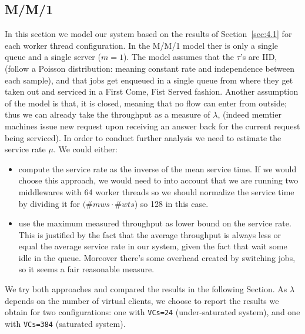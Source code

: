 \documentclass[11pt,a4paper]{article}
\begin{document}
\subsection{M/M/1}

In this section we model our system based on the results of Section~\ref{sec:4.1} for each worker thread configuration.
In the M/M/1 model ther is only a single queue and a single server ($m=1$). The model assumes that the $\tau$'s are IID, (follow a Poisson distribution: meaning constant rate and independence between each sample), and that jobs get enqueued in a single queue from where they get taken out and serviced in a First Come, Fist Served fashion. Another assumption of the model is that, it is closed, meaning that no flow can enter from outside; thus we can already take the throughput as a measure of $\lambda$, (indeed memtier machines issue new request upon receiving an answer back for the current request being serviced). 
In order to conduct further analysis we need to estimate the service rate $\mu$. We could either:
\begin{itemize}
    \item compute the service rate as the inverse of the mean service time. If we would choose this approach, we would need to into account that we are running two middlewares with 64 worker threads so we should normalize the service time by dividing it for $(\#mws \cdot \#wts$) so 128 in this case.
    \item use the maximum measured throughput as lower bound on the service rate. This is justified by the fact that the average throughput is always less or equal the average service rate in our system, given the fact that wait some idle in the queue. Moreover there's some overhead created by switching jobs, so it seems a fair reasonable measure.
\end{itemize}
We try both approaches and compared the results in the following Section.
As $\lambda$ depends on the number of virtual clients, we choose to report the results we obtain for two configurations: one with \texttt{VCs=24} (under-saturated system), and one with \texttt{VCs=384} (saturated system). 
\end{document}
